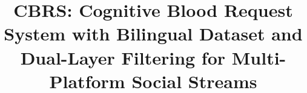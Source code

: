 \documentclass[11pt]{article}
\begin{document}
\title{CBRS: Cognitive Blood Request System with Bilingual Dataset and Dual-Layer Filtering for Multi-Platform Social Streams}

\maketitle
\end{document}
